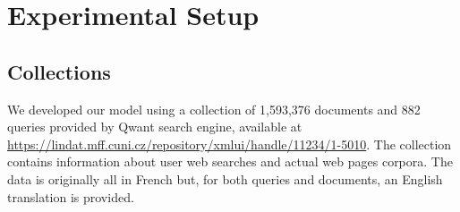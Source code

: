 \section{Experimental Setup}
\label{sec:setup}

\subsection{Collections}
We developed our model using a collection of 1,593,376 documents and 882 queries provided by Qwant search engine, available at \url{https://lindat.mff.cuni.cz/repository/xmlui/handle/11234/1-5010}.
\newline
The collection contains information about user web searches and actual web pages corpora. The data is originally all in French but, for both queries and documents, an English translation is provided.


